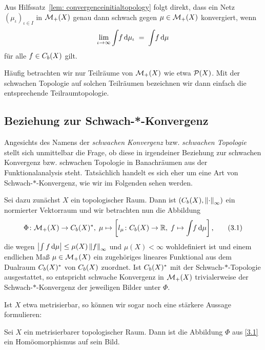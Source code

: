 \documentclass[../main/main.tex]{subfiles}
\begin{document}
	\begin{Bemerkung}
		Aus Hilfssatz~\ref{lem: convergenceinitialtopology} folgt direkt, dass ein Netz $(\mu_\iota)_{\iota \in I}$ in $\mathcal{M}_{+}(X)$ genau dann schwach gegen $\mu \in \mathcal{M}_{+}(X)$
		konvergiert, wenn
		\[ \lim_{\iota \to \infty} \int_{} \, f \, \mathrm{d}\mu_\iota \; = \; \int_{} \, f \, \mathrm{d}\mu \]
		für alle $f \in C_b(X)$ gilt.
	\end{Bemerkung}

	Häufig betrachten wir nur Teilräume von $\mathcal{M}_{+}(X)$ wie etwa $\mathcal{P}(X)$. Mit der schwachen Topologie auf solchen Teilräumen bezeichnen wir 
	dann einfach die entsprechende Teilraumtopologie.

	\subsection{Beziehung zur Schwach-*-Konvergenz}
	\label{subsec:BeziehungSchwachStern}
	
	Angesichts des Namens der \emph{schwachen Konvergenz} bzw. \emph{schwachen Topologie} stellt sich unmittelbar die Frage, ob diese in irgendeiner Beziehung zur schwachen Konvergenz bzw. schwachen Topologie in Banachräumen aus der 
	Funktionalanalysis steht. Tatsächlich handelt es sich eher um eine Art von Schwach-$\ast$-Konvergenz, wie wir im Folgenden sehen werden. 
	
	Sei dazu zunächst $X$ ein topologischer Raum. Dann ist $(C_b(X), \left\lVert\cdot\right\rVert_\infty)$ ein normierter Vektorraum und wir betrachten nun die Abbildung
	\[\Phi \colon \mathcal{M}_{+}(X) \to C_b(X)^\ast, \; \mu \mapsto \left[l_\mu \colon C_b(X) \to \mathbb{R}, \; f \mapsto \int_{} \, f \, \mathrm{d}\mu \right]  \text{,} \label{3.1} \tag{3.1}\]
	die wegen $\left| \int_{} \, f \, \mathrm{d}\mu \right| \leq \mu(X) \left\lVert f\right\rVert_\infty$ und $\mu(X) < \infty$ wohldefiniert ist 
	und einem endlichen Maß $\mu \in \mathcal{M}_{+}(X)$ ein zugehöriges lineares Funktional aus dem Dualraum $C_b(X)^\ast$ von $C_b(X)$ zuordnet. 
	Ist $C_b(X)^\ast$ mit der 
	Schwach-$\ast$-Topologie ausgestattet, so entspricht schwache Konvergenz in $\mathcal{M}_{+}(X)$ trivialerweise der 
	Schwach-$\ast$-Konvergenz der jeweiligen Bilder unter $\Phi$.
	
	Ist $X$ etwa metrisierbar, so können wir sogar noch eine stärkere Aussage formulieren:
	
	\begin{Hilfssatz}
		Sei $X$ ein metrisierbarer topologischer Raum. Dann ist die Abbildung $\Phi$ aus \eqref{3.1} ein Homöomorphismus auf sein Bild.
	\end{Hilfssatz}
\end{document}
